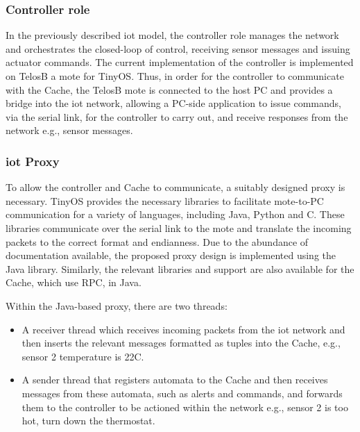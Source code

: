 \documentclass{mpaper}
\begin{document}
\subsubsection*{Controller role} %
\label{ssub:controller_role}
In the previously described iot model, the controller role manages the network and orchestrates the closed-loop of control, receiving sensor messages and issuing actuator commands. The current implementation of the controller is implemented on TelosB a mote for TinyOS. Thus, in order for the controller to communicate with the Cache, the TelosB mote is connected to the host PC and provides a bridge into the iot network, allowing a PC-side application to issue commands, via the serial link, for the controller to carry out, and receive responses from the network e.g., sensor messages. 

\subsubsection*{iot Proxy} %
\label{ssub:iot_proxy}
To allow the controller and Cache to communicate, a suitably designed proxy is necessary. TinyOS provides the necessary libraries to facilitate mote-to-PC communication for a variety of languages, including Java, Python and C. These libraries communicate over the serial link to the mote and translate the incoming packets to the correct format and endianness. Due to the abundance of documentation available, the proposed proxy design is implemented using the Java library. Similarly, the relevant libraries and support are also available for the Cache, which use RPC, in Java.

Within the Java-based proxy, there are two threads:
\begin{itemize}
   \item A receiver thread which receives incoming packets from the iot network and then inserts the relevant messages formatted as tuples into the Cache, e.g., sensor 2 temperature is 22C.
   \item A sender thread that registers automata to the Cache and then receives messages from these automata, such as alerts and commands, and forwards them to the controller to be actioned within the network e.g., sensor 2 is too hot, turn down the thermostat. 
 \end{itemize}
\end{document}
